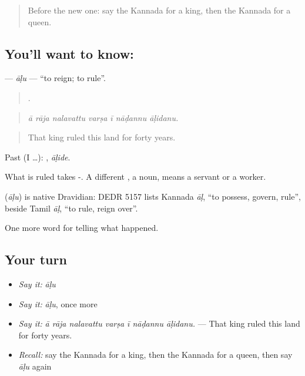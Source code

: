 \label{lesson:KA-C322-alu-rule}



\begin{quote}
Before the new one: say the Kannada for a king, then the Kannada for a queen.
\end{quote}

\subsection*{You'll want to know: }
\textbf{} — \emph{āḷu} — \textquotedblleft{}to reign; to rule\textquotedblright{}.

\begin{quote}
      .
\end{quote}

\begin{quote}
\emph{ā rāja nalavattu varṣa ī nāḍannu āḷidanu.}
\end{quote}

\begin{quote}
That king ruled this land for forty years.
\end{quote}

Past (I …): , \emph{āḷide}.

What is ruled takes -. A different , a noun, means a servant or a worker.

\begin{cousinweb}
\textbf{} (\emph{āḷu}) is native Dravidian: DEDR 5157 lists Kannada \emph{āḷ}, \textquotedblleft{}to possess, govern, rule\textquotedblright{}, beside Tamil \emph{āḷ}, \textquotedblleft{}to rule, reign over\textquotedblright{}.
\end{cousinweb}

\begin{grammarlens}[title={What you've built}]
One more word for telling what happened.
\end{grammarlens}

\subsection*{Your turn}
\begin{itemize}
\raggedright
  \item \emph{Say it:} \emph{āḷu}
  \item \emph{Say it:} \emph{āḷu}, once more
  \item \emph{Say it:} \emph{ā rāja nalavattu varṣa ī nāḍannu āḷidanu.} — That king ruled this land for forty years.
  \item \emph{Recall:} say the Kannada for a king, then the Kannada for a queen, then say \emph{āḷu} again
\end{itemize}

